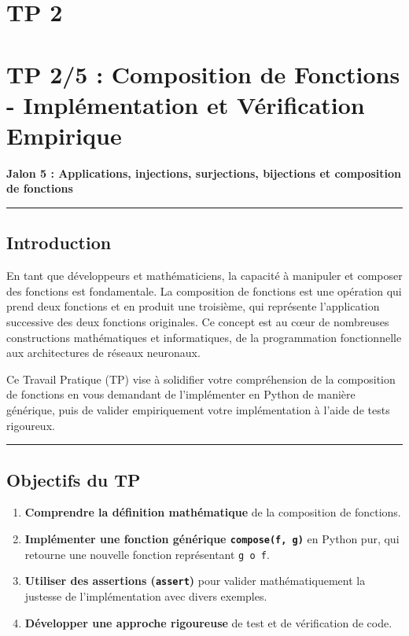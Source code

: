 \documentclass[12pt,a4paper]{report}
\newcommand{\passthrough}[1]{#1}
\providecommand{\tightlist}{%
  \setlength{\itemsep}{0pt}\setlength{\parskip}{0pt}}
\begin{document}
\section{TP 2}
\section{TP 2/5 : Composition de Fonctions - Implémentation et
Vérification
Empirique}\label{tp-25-composition-de-fonctions---impluxe9mentation-et-vuxe9rification-empirique}

\textbf{Jalon 5 : Applications, injections, surjections, bijections et
composition de fonctions}

\begin{center}\rule{0.5\linewidth}{0.5pt}\end{center}

\subsection{Introduction}\label{introduction}

En tant que développeurs et mathématiciens, la capacité à manipuler et
composer des fonctions est fondamentale. La composition de fonctions est
une opération qui prend deux fonctions et en produit une troisième, qui
représente l'application successive des deux fonctions originales. Ce
concept est au cœur de nombreuses constructions mathématiques et
informatiques, de la programmation fonctionnelle aux architectures de
réseaux neuronaux.

Ce Travail Pratique (TP) vise à solidifier votre compréhension de la
composition de fonctions en vous demandant de l'implémenter en Python de
manière générique, puis de valider empiriquement votre implémentation à
l'aide de tests rigoureux.

\begin{center}\rule{0.5\linewidth}{0.5pt}\end{center}

\subsection{Objectifs du TP}\label{objectifs-du-tp}

\begin{enumerate}
\def\labelenumi{\arabic{enumi}.}
\tightlist
\item
  \textbf{Comprendre la définition mathématique} de la composition de
  fonctions.
\item
  \textbf{Implémenter une fonction générique
  \passthrough{\lstinline!compose(f, g)!}} en Python pur, qui retourne
  une nouvelle fonction représentant \passthrough{\lstinline!g o f!}.
\item
  \textbf{Utiliser des assertions (\passthrough{\lstinline!assert!})}
  pour valider mathématiquement la justesse de l'implémentation avec
  divers exemples.
\item
  \textbf{Développer une approche rigoureuse} de test et de vérification
  de code.
\end{enumerate}
\end{document}
